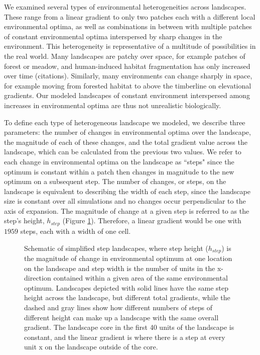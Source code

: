 We examined several types of environmental heterogeneities across landscapes. These range from a linear gradient to only two patches each with a different local environmental optima, as well as combinations in between with multiple patches of constant environmental optima interspersed by sharp changes in the environment. This heterogeneity is representative of a multitude of possibilities in the real world. Many landscapes are patchy over space, for example patches of forest or meadow, and human-induced habitat fragmentation has only increased over time (citations). Similarly, many environments can change sharply in space, for example moving from forested habitat to above the timberline on elevational gradients. %
Our modeled landscapes of constant environment interspersed among increases in environmental optima are thus not unrealistic biologically. 

To define each type of heterogeneous landscape we modeled, we describe three parameters: the number of changes in environmental optima over the landscape, the magnitude of each of these changes, and the total gradient value across the landscape, which can be calculated from the previous two values. We refer to each change in environmental optima on the landscape as ``steps" since the optimum is constant within a patch then changes in magnitude to the new optimum on a subsequent step. The number of changes, or steps, on the landscape is equivalent to describing the width of each step, since the landscape size is constant over all simulations and no changes occur perpendicular to the axis of expansion. The magnitude of change at a given step is referred to as the step's height, $h_{step}$ (Figure \ref{fig:stepschematic}). Therefore, a linear gradient would be one with $1959$ steps, each with a width of one cell. 

\begin{figure}[h]
\centering
{}
\caption[Schematic of step landscapes.]{Schematic of simplified step landscapes, where step height ($h_{step}$) is the magnitude of change in environmental optimum at one location on the landscape and step width is the number of units in the x-direction contained within a given area of the same environmental optimum. Landscapes depicted with solid lines have the same step height across the landscape, but different total gradients, while the dashed and gray lines show how different numbers of steps of different height can make up a landscape with the same overall gradient. The landscape core in the first 40 units of the landscape is constant, and the linear gradient is where there is a step at every unit x on the landscape outside of the core.}
\label{fig:stepschematic}
\end{figure}


